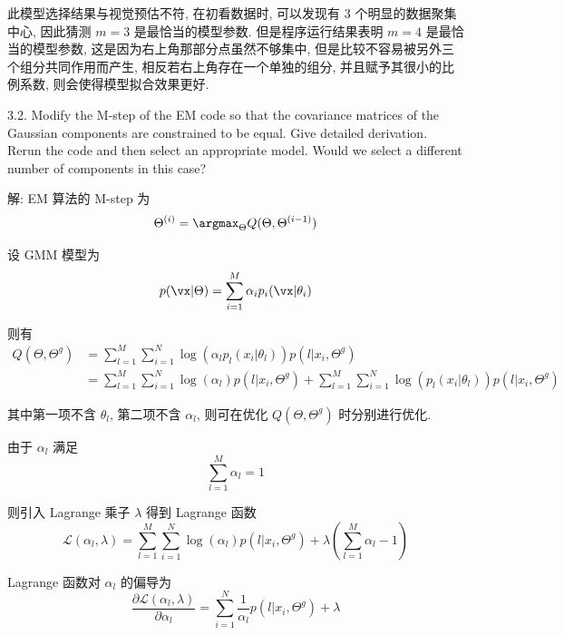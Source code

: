 \documentclass[openany]{ctexbook}
\theoremstyle{kaiti}
\theoremstyle{normal}
\begin{document}
此模型选择结果与视觉预估不符, 在初看数据时, 可以发现有 3 个明显的数据聚集中心, 因此猜测 $m=3$ 是最恰当的模型参数. 但是程序运行结果表明 $m=4$ 是最恰当的模型参数, 这是因为右上角那部分点虽然不够集中, 但是比较不容易被另外三个组分共同作用而产生, 相反若右上角存在一个单独的组分, 并且赋予其很小的比例系数, 则会使得模型拟合效果更好.

3.2. Modify the M-step of the EM code so that the covariance matrices of the Gaussian components are constrained to be equal. Give detailed derivation. Rerun the code and then select an appropriate model. Would we select a different number of components in this case?

解: EM 算法的 M-step 为
\begin{equation}
  \Theta^{(i)}=\argmax_{\Theta} Q(\Theta,\Theta^{(i-1)})
\end{equation}

设 GMM 模型为
\begin{equation}
  p(\vx|\Theta)=\sum_{i=1}^M\alpha_ip_i(\vx|\theta_i)
\end{equation}

则有
\begin{equation}
  \begin{aligned}
    Q(\Theta,\Theta^g)
    &=\sum_{l=1}^M\sum_{i=1}^N\log(\alpha_lp_l(x_i|\theta_l))p(l|x_i,\Theta^g)\\
    &=\sum_{l=1}^M\sum_{i=1}^N\log(\alpha_l)p(l|x_i,\Theta^g)+\sum_{l=1}^M\sum_{i=1}^N\log(p_l(x_i|\theta_l))p(l|x_i,\Theta^g)
  \end{aligned}
\end{equation}

其中第一项不含 $\theta_l$, 第二项不含 $\alpha_l$, 则可在优化 $Q(\Theta,\Theta^g)$ 时分别进行优化.

由于 $\alpha_l$ 满足
\begin{equation}
  \sum_{l=1}^M\alpha_l=1
\end{equation}

则引入 Lagrange 乘子 $\lambda$ 得到 Lagrange 函数
\begin{equation}
  \mathcal{L}(\alpha_l,\lambda)=\sum_{l=1}^M\sum_{i=1}^N\log(\alpha_l)p(l|x_i,\Theta^g)+\lambda\left(\sum_{l=1}^M\alpha_l-1\right)
\end{equation}

Lagrange 函数对 $\alpha_l$ 的偏导为
\begin{equation}
  \frac{\partial \mathcal{L}(\alpha_l,\lambda)}{\partial \alpha_l}
  =\sum_{i=1}^N\frac{1}{\alpha_l}p(l|x_i,\Theta^g)+\lambda
\end{equation}
\end{document}
